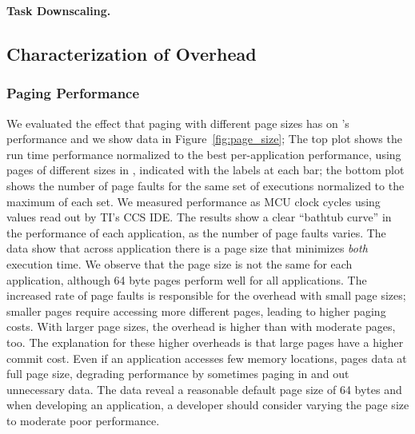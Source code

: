 \textbf{Task Downscaling.} 

\subsection{Characterization of \sys Overhead}
\label{sec:coala_overhead}


\subsubsection{\sys Paging Performance}
\label{sec:results_memory_management}

We evaluated the effect that paging with different page sizes has on \sys's performance and we show data in Figure~\ref{fig:page_size}; The top plot shows the run time performance normalized to the best per-application performance, using pages of different sizes in \sys, indicated with the labels at each bar; the bottom plot shows the number of page faults for the same set of executions normalized to the maximum of each set. We measured performance as MCU clock cycles using values read out by TI's CCS IDE. The results show a clear ``bathtub curve'' in the performance of each application, as the number of page faults varies. The data show that across application there is a page size that minimizes \emph{both} execution time. We observe that the page size is not the same for each application, although 64 byte pages perform well for all applications. The increased rate of page faults is responsible for the overhead with small page sizes; smaller pages require accessing more different pages, leading to higher paging costs. With larger page sizes, the overhead is higher than with moderate pages, too. The explanation for these higher overheads is that large pages have a higher commit cost. Even if an application accesses few memory locations, \sys pages data at full page size, degrading performance by sometimes paging in and out unnecessary data. The data reveal a reasonable default page size of 64 bytes and when developing an application, a developer should consider varying the page size to moderate poor performance.

